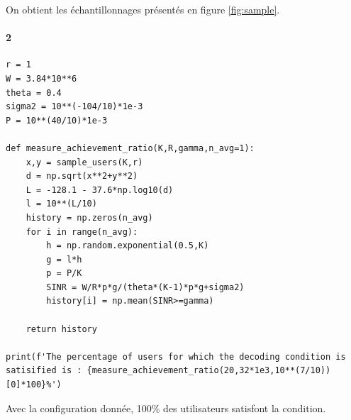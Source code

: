 \documentclass[a4paper,11pt,2]{article}
\begin{document}
On obtient les échantillonnages présentés en figure \ref{fig:sample}.

\paragraph{2}
\begin{center}
\begin{lstlisting}
r = 1
W = 3.84*10**6
theta = 0.4
sigma2 = 10**(-104/10)*1e-3
P = 10**(40/10)*1e-3

def measure_achievement_ratio(K,R,gamma,n_avg=1):
    x,y = sample_users(K,r)
    d = np.sqrt(x**2+y**2)
    L = -128.1 - 37.6*np.log10(d)
    l = 10**(L/10)
    history = np.zeros(n_avg)
    for i in range(n_avg):
        h = np.random.exponential(0.5,K)
        g = l*h
        p = P/K
        SINR = W/R*p*g/(theta*(K-1)*p*g+sigma2)
        history[i] = np.mean(SINR>=gamma)

    return history

print(f'The percentage of users for which the decoding condition is satisified is : {measure_achievement_ratio(20,32*1e3,10**(7/10))[0]*100}%')
\end{lstlisting}
\end{center}

Avec la configuration donnée, 100\% des utilisateurs satisfont la condition.
\end{document}
